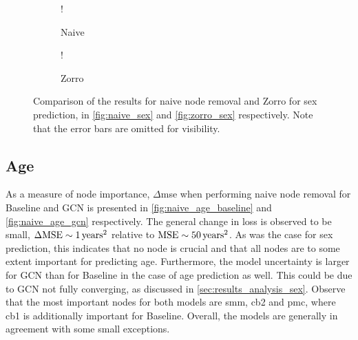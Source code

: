\begin{figure}[!htbp]
    \centering
        \begin{subfigure}{.5\textwidth}
            \centering
            \begin{center}
                \resizebox {1.0\linewidth} {!} {
                    
                }
            \end{center}
            \caption{Naive}
            \label{fig:comparison_sex_naive}
        \end{subfigure}%
        \begin{subfigure}{.5\textwidth}
            \centering
            \begin{center}
                \resizebox {1.0\linewidth} {!} {
                    
                }
            \end{center}
            \caption{Zorro}
            \label{fig:comparison_sex_zorro}
        \end{subfigure}
    \caption{Comparison of the results for naive node removal and Zorro for sex prediction, in \cref{fig:naive_sex} and \cref{fig:zorro_sex} respectively. Note that the error bars are omitted for visibility.}
    \label{fig:comparison_sex}
\end{figure}



\subsection{Age}

As a measure of node importance, $\Delta$\acrshort{mse} when performing naive node removal for Baseline and GCN is presented in \cref{fig:naive_age_baseline} and \cref{fig:naive_age_gcn} respectively. The general change in loss is observed to be small, $\Delta\text{MSE}\sim1\rm\,years^2$ relative to $\text{MSE}\sim50\rm\,years^2$. As was the case for sex prediction, this indicates that no node is crucial and that all nodes are to some extent important for predicting age. Furthermore, the model uncertainty is larger for GCN than for Baseline in the case of age prediction as well. This could be due to GCN not fully converging, as discussed in \cref{sec:results_analysis_sex}. Observe that the most important nodes for both models are \acrshort{smm}, \acrshort{cb2} and \acrshort{pmc}, where \acrshort{cb1} is additionally important for Baseline. Overall, the models are generally in agreement with some small exceptions. 

